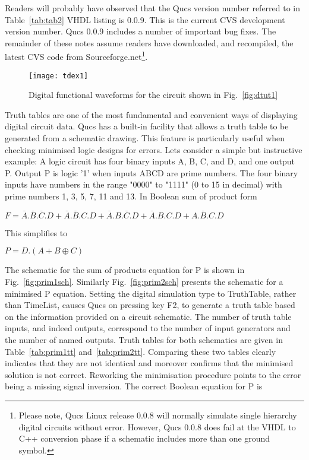 Readers will probably have observed that the Qucs version number
referred to in Table~\ref{tab:tab2} VHDL listing is 0.0.9.  This is
the current CVS development version number.  Qucs 0.0.9 includes a
number of important bug fixes.  The remainder of these notes assume
readers have downloaded, and recompiled, the latest CVS code from
Sourceforge.net\footnote{Please note, Qucs Linux release 0.0.8 will
normally simulate single hierarchy digital circuits without error.
However, Qucs 0.0.8 does fail at the VHDL to C++ conversion phase if a
schematic includes more than one ground symbol.}.

\begin{figure}[ht]
  \centering
  \texttt{[image: tdex1]}
  \caption{Digital functional waveforms for the circuit shown in Fig.~\ref{fig:dtut1}}
  \label{fig:tdex1}
\end{figure}
\FloatBarrier


Truth tables are one of the most fundamental and convenient ways of
displaying digital circuit data.  Qucs has a built-in facility that
allows a truth table to be generated from a schematic drawing.  This
feature is particularly useful when checking minimised logic designs
for errors.  Lets consider a simple but instructive example: A logic
circuit has four binary inputs A, B, C, and D, and one output P.
Output P is logic '1' when inputs ABCD are prime numbers.  The four
binary inputs have numbers in the range "0000" to "1111" (0 to 15 in
decimal) with prime numbers 1, 3, 5, 7, 11 and 13.  In Boolean sum of
product form \\
\begin{center}
\begin{large}$F=\overline{A}.\overline{B}.\overline{C}.D+\overline{A}.\overline{B}.C.D+
\overline{A}.B.\overline{C}.D+\overline{A}.B.C.D+A.\overline{B}.C.D$
\end{large}\end{center}

This simplifies to\\
\begin{center}
\begin{large}$P=D.(A+B \oplus C )$\end{large}
\end{center}
The schematic for the sum of products equation for P is shown in
Fig.~\ref{fig:prim1sch}.  Similarly Fig.~\ref{fig:prim2sch} presents
the schematic for a minimised P equation.  Setting the digital
simulation type to TruthTable, rather than TimeList, causes Qucs on
pressing key F2, to generate a truth table based on the information
provided on a circuit schematic. The number of truth table inputs, and
indeed outputs, correspond to the number of input generators and the
number of named outputs. Truth tables for both schematics are given in
Table~\ref{tab:prim1tt} and~\ref{tab:prim2tt}. Comparing these two
tables clearly indicates that they are not identical and moreover
confirms that the minimised solution is not correct.  Reworking the
minimisation procedure points to the error being a missing signal
inversion.  The correct Boolean equation for P is

